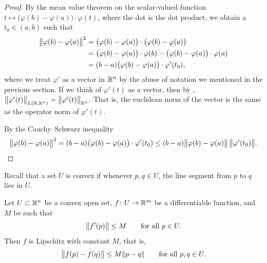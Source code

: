 \begin{proof}
By the mean value theorem on the scalar-valued function
$t \mapsto \bigl(\varphi(b)-\varphi(a) \bigr) \cdot \varphi(t)$,
where the dot is the dot product, we obtain
a $t_0 \in (a,b)$ such that
\begin{equation*}
\begin{split}
\bigl\lVert {\varphi(b)-\varphi(a)} \bigr\rVert^2
& =
\bigl( \varphi(b)-\varphi(a) \bigr)
\cdot
\bigl( \varphi(b)-\varphi(a) \bigr)
\\
& =
\bigl(\varphi(b)-\varphi(a) \bigr) \cdot \varphi(b) - 
\bigl(\varphi(b)-\varphi(a) \bigr) \cdot \varphi(a)
\\
& = 
(b-a)
\bigl(\varphi(b)-\varphi(a) \bigr) \cdot \varphi'(t_0) ,
\end{split}
\end{equation*}
where we treat $\varphi'$ as a vector in ${\mathbb{R}}^n$ by the abuse of
notation we mentioned in the previous section.
If we think of $\varphi'(t)$ as a vector, then by
,
$\bigl\lVert {\varphi'(t)} \bigr\rVert_{L({\mathbb{R}},{\mathbb{R}}^n)} = \bigl\lVert {\varphi'(t)} \bigr\rVert_{{\mathbb{R}}^n}$.
That is, the euclidean norm of the vector is the same as the operator norm
of $\varphi'(t)$.

By the Cauchy--Schwarz inequality
\begin{equation*}
\bigl\lVert {\varphi(b)-\varphi(a)} \bigr\rVert^2
=
(b-a)\bigl(\varphi(b)-\varphi(a) \bigr) \cdot \varphi'(t_0)
\leq
(b-a)
\bigl\lVert {\varphi(b)-\varphi(a)} \bigr\rVert \, \bigl\lVert {\varphi'(t_0)} \bigr\rVert . \qedhere
\end{equation*}
\end{proof}

Recall that a set $U$ is convex
if whenever $p,q \in U$, the line segment from
$p$ to $q$ lies in $U$.

\begin{prop} \label{mv:prop:convexlip}
Let $U \subset {\mathbb{R}}^n$ be a convex open set, $f \colon U \to {\mathbb{R}}^m$
be a differentiable function, and $M$ be such that
\begin{equation*}
\bigl\lVert {f'(p)} \bigr\rVert \leq M
\qquad \text{for all } p \in U.
\end{equation*}
Then $f$ is Lipschitz with constant $M$, that is,
\begin{equation*}
\bigl\lVert {f(p)-f(q)} \bigr\rVert \leq M \lVert {p-q} \rVert
\qquad
\text{for all } p,q \in U.
\end{equation*}
\end{prop}

